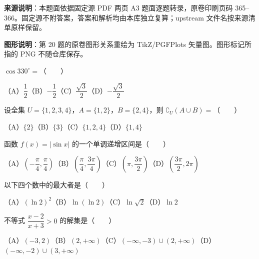 


\begin{gktip}
\textbf{来源说明}：本题面依据固定源 PDF 两页 A3 题面逐题转录，原卷印刷页码 365–366。固定源不附答案，答案和解析均由本库独立复算；upstream 文件名按来源清单原样保留。

\textbf{图形说明}：第 20 题的原卷图形关系重绘为 TikZ/PGFPlots 矢量图。图形标记所指的 PNG 不随仓库保存。
\end{gktip}


\begin{question}
$\cos330^\circ=$\mbox{（　　）}

（A）$\dfrac12$\quad（B）$-\dfrac12$\quad（C）$\dfrac{\sqrt3}{2}$\quad（D）$-\dfrac{\sqrt3}{2}$

\end{question}
\begin{question}
设全集 $U=\{1,2,3,4\}$，$A=\{1,2\}$，$B=\{2,4\}$，则 $\complement_U(A\cup B)=$\mbox{（　　）}

（A）$\{2\}$\quad（B）$\{3\}$\quad（C）$\{1,2,4\}$\quad（D）$\{1,4\}$

\end{question}
\begin{question}
函数 $f(x)=|\sin x|$ 的一个单调递增区间是\mbox{（　　）}

（A）$\left(-\dfrac\pi4,\dfrac\pi4\right)$\quad（B）$\left(\dfrac\pi4,\dfrac{3\pi}4\right)$\quad（C）$\left(\pi,\dfrac{3\pi}2\right)$\quad（D）$\left(\dfrac{3\pi}2,2\pi\right)$

\end{question}
\begin{question}
以下四个数中的最大者是\mbox{（　　）}

（A）$(\ln2)^2$\quad（B）$\ln(\ln2)$\quad（C）$\ln\sqrt2$\quad（D）$\ln2$

\end{question}
\begin{question}
不等式 $\dfrac{x-2}{x+3}>0$ 的解集是\mbox{（　　）}

（A）$(-3,2)$\quad（B）$(2,+\infty)$\quad（C）$(-\infty,-3)\cup(2,+\infty)$\quad（D）$(-\infty,-2)\cup(3,+\infty)$

\end{question}
